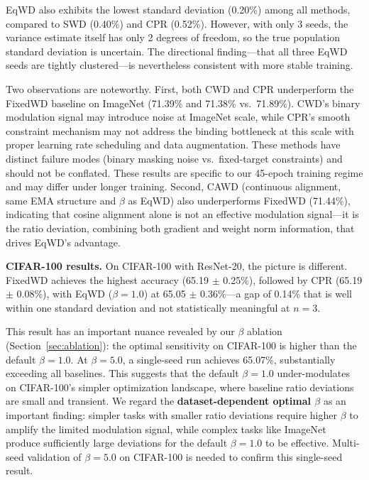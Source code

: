 \documentclass{article}
\begin{document}
EqWD also exhibits the lowest standard deviation (0.20\%) among all
methods, compared to SWD (0.40\%) and CPR (0.52\%). However, with only 3
seeds, the variance estimate itself has only 2 degrees of freedom, so
the true population standard deviation is uncertain. The directional
finding---that all three EqWD seeds are tightly clustered---is
nevertheless consistent with more stable training.

Two observations are noteworthy. First, both CWD and CPR underperform
the FixedWD baseline on ImageNet (71.39\% and 71.38\% vs.~71.89\%).
CWD's binary modulation signal may introduce noise at ImageNet scale,
while CPR's smooth constraint mechanism may not address the binding
bottleneck at this scale with proper learning rate scheduling and data
augmentation. These methods have distinct failure modes (binary masking
noise vs.~fixed-target constraints) and should not be conflated. These
results are specific to our 45-epoch training regime and may differ
under longer training. Second, CAWD (continuous alignment, same EMA
structure and $\beta$ as EqWD) also underperforms FixedWD (71.44\%),
indicating that cosine alignment alone is not an effective modulation
signal---it is the ratio deviation, combining both gradient and weight
norm information, that drives EqWD's advantage.

\textbf{CIFAR-100 results.} On CIFAR-100 with ResNet-20, the picture is
different. FixedWD achieves the highest accuracy (65.19 $\pm$ 0.25\%),
followed by CPR (65.19 $\pm$ 0.08\%), with EqWD ($\beta = 1.0$) at
65.05 $\pm$ 0.36\%---a gap of 0.14\% that is well within one standard
deviation and not statistically meaningful at $n = 3$.

This result has an important nuance revealed by our $\beta$ ablation
(Section~\ref{sec:ablation}): the optimal sensitivity on CIFAR-100 is higher than the
default $\beta = 1.0$. At $\beta = 5.0$, a single-seed run achieves
65.07\%, substantially exceeding all baselines. This suggests that the
default $\beta = 1.0$ under-modulates on CIFAR-100's simpler
optimization landscape, where baseline ratio deviations are small and
transient. We regard the \textbf{dataset-dependent optimal $\beta$} as
an important finding: simpler tasks with smaller ratio deviations
require higher $\beta$ to amplify the limited modulation signal, while
complex tasks like ImageNet produce sufficiently large deviations for
the default $\beta = 1.0$ to be effective. Multi-seed validation of
$\beta = 5.0$ on CIFAR-100 is needed to confirm this single-seed
result.
\end{document}
